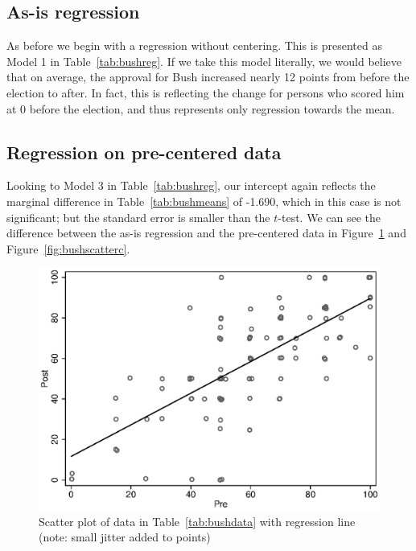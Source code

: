 \subsection{As-is regression}

As before we begin with a regression without centering. This is presented as Model 1 in Table~\ref{tab:bushreg}. If we take this model literally, we would believe that on average, the approval for Bush increased nearly 12 points from before the election to after. In fact, this is reflecting the change for persons who scored him at 0 before the election, and thus represents only regression towards the mean.

\subsection{Regression on pre-centered data}

Looking to Model 3 in Table~\ref{tab:bushreg}, our intercept again reflects the marginal difference in Table~\ref{tab:bushmeans} of -1.690, which in this case is not significant; but the standard error is smaller than the $t$-test. We can see the difference between the as-is regression and the pre-centered data in Figure~\ref{fig:bushscatter} and Figure~\ref{fig:bushscatterc}.

\begin{figure}
   \centering
   \includegraphics[angle=0,
           width=.75\textwidth]{bushscatter.eps}
   \caption{Scatter plot of data in Table~\ref{tab:bushdata} with regression line (note: small jitter added to points)}
  \label{fig:bushscatter}
\end{figure}


